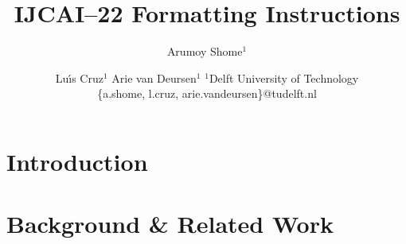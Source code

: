 \documentclass{article}
\title{IJCAI--22 Formatting Instructions}
\author{
  Arumoy Shome$^1$
  \and
  Lu{\'\i}s Cruz$^1$\And
  Arie van Deursen$^{1}$
  \affiliations
  $^1$Delft University of Technology\\
  \emails
  \{a.shome, l.cruz, arie.vandeursen\}@tudelft.nl
}
\begin{document}
\maketitle

\begin{abstract}
\end{abstract}

\section{Introduction}\label{sec:intro}






\section{Background \& Related Work}\label{sec:related}



\end{document}
